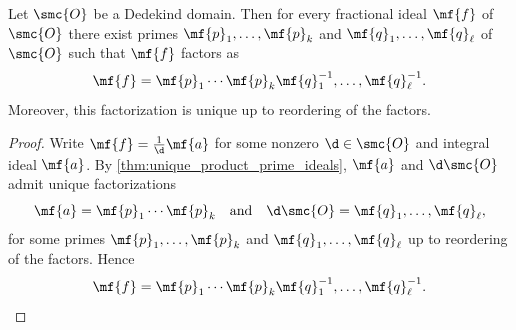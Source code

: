     \begin{corollary}\label{cor:fractional_ideal_prime_factorization}
      Let \(\smc{O}\) be a Dedekind domain. Then for every fractional ideal \(\mf{f}\) of \(\smc{O}\) there exist primes \(\mf{p}_{1},\ldots,\mf{p}_{k}\) and \(\mf{q}_{1},\ldots,\mf{q}_{\ell}\) of \(\smc{O}\) such that \(\mf{f}\) factors as
      \[
        \mf{f} = \mf{p}_{1} \cdots \mf{p}_{k}\mf{q}_{1}^{-1},\ldots,\mf{q}_{\ell}^{-1}.
      \]
      Moreover, this factorization is unique up to reordering of the factors.
    \end{corollary}
    \begin{proof}
      Write \(\mf{f} = \frac{1}{\d}\mf{a}\) for some nonzero \(\d \in \smc{O}\) and integral ideal \(\mf{a}\). By \cref{thm:unique_product_prime_ideals}, \(\mf{a}\) and \(\d\smc{O}\) admit unique factorizations
      \[
        \mf{a} = \mf{p}_{1} \cdots \mf{p}_{k} \quad \text{and} \quad \d\smc{O} = \mf{q}_{1},\ldots,\mf{q}_{\ell},
      \]
      for some primes \(\mf{p}_{1},\ldots,\mf{p}_{k}\) and \(\mf{q}_{1},\ldots,\mf{q}_{\ell}\) up to reordering of the factors. Hence
      \[
        \mf{f} = \mf{p}_{1} \cdots \mf{p}_{k}\mf{q}_{1}^{-1},\ldots,\mf{q}_{\ell}^{-1}.
      \]
    \end{proof}

